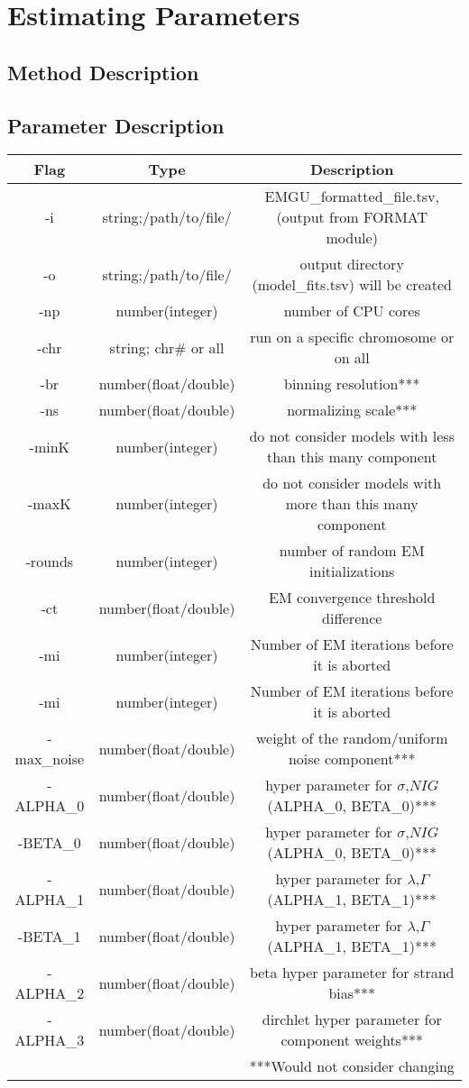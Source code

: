 \documentclass{article}
\theoremstyle{definition}
\begin{document}
\section{Estimating Parameters}
\subsection{Method Description}
\subsection{Parameter Description}
\begin{center}
\begin{tabular}{ |c|c|c| } 
 \hline
 Flag & Type & Description \\ 
 \hline
 \hline
 -i & string;/path/to/file/ & EMGU\_formatted\_file.tsv, (output from FORMAT module) \\ 
 \hline
 -o & string;/path/to/file/ & output directory (model\_fits.tsv) will be created \\ 
 \hline
 -np & number(integer) & number of CPU cores \\ 
 \hline
 -chr & string; chr\# or all & run on a specific chromosome or on all \\ 
 \hline
 -br & number(float/double) & binning resolution*** \\ 
 \hline
-ns & number(float/double) & normalizing scale*** \\ 
 \hline
 -minK & number(integer) & do not consider models with less than this many component \\ 
 \hline
 -maxK & number(integer) & do not consider models with more than this many component \\ 
 \hline
 -rounds & number(integer) & number of random EM initializations \\ 
 \hline
 -ct & number(float/double) & EM convergence threshold difference \\ 
 \hline
 -mi & number(integer) & Number of EM iterations before it is aborted \\ 
 \hline
 -mi & number(integer) & Number of EM iterations before it is aborted \\ 
 \hline
 -max\_noise & number(float/double) & weight of the random/uniform noise component*** \\ 
 \hline
 -ALPHA\_0 & number(float/double) & hyper parameter for $\sigma$,$NIG$(ALPHA\_0, BETA\_0)*** \\ 
 \hline
 -BETA\_0 & number(float/double) & hyper parameter for $\sigma$,$NIG$(ALPHA\_0, BETA\_0)*** \\ 
 \hline
 -ALPHA\_1 & number(float/double) & hyper parameter for $\lambda$,$\Gamma$(ALPHA\_1, BETA\_1)*** \\ 
 \hline
 -BETA\_1 & number(float/double) & hyper parameter for $\lambda$,$\Gamma$(ALPHA\_1, BETA\_1)*** \\ 
 \hline
 -ALPHA\_2 & number(float/double) & beta hyper parameter for strand bias*** \\ 
 \hline
 -ALPHA\_3 & number(float/double) & dirchlet hyper parameter for component weights*** \\ 
 \hline
 \hline
&&***Would not consider changing\\ 
 \hline



\end{tabular}
\end{center}
\end{document}
